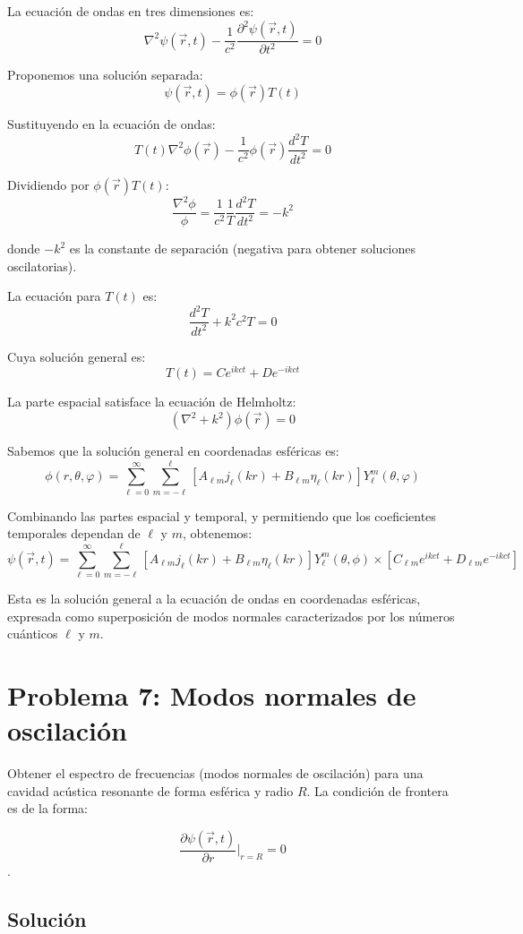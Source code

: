 \documentclass[a4paper]{article}
\begin{document}
La ecuación de ondas en tres dimensiones es:
$$\nabla^2\psi(\vec{r}, t) - \frac{1}{c^2}\frac{\partial^2\psi(\vec{r}, t)}{\partial t^2} = 0$$


Proponemos una solución separada:
$$\psi(\vec{r}, t) = \phi(\vec{r})T(t)$$

Sustituyendo en la ecuación de ondas:
$$T(t)\nabla^2\phi(\vec{r}) - \frac{1}{c^2}\phi(\vec{r})\frac{d^2T}{dt^2} = 0$$

Dividiendo por $\phi(\vec{r})T(t)$:
$$\frac{\nabla^2\phi}{\phi} = \frac{1}{c^2}\frac{1}{T}\frac{d^2T}{dt^2} = -k^2$$

donde $-k^2$ es la constante de separación (negativa para obtener soluciones oscilatorias).


La ecuación para $T(t)$ es:
$$\frac{d^2T}{dt^2} + k^2c^2T = 0$$

Cuya solución general es:
$$T(t) = C e^{ikct} + D e^{-ikct}$$

La parte espacial satisface la ecuación de Helmholtz:
$$(\nabla^2 + k^2)\phi(\vec{r}) = 0$$

Sabemos que la solución general en coordenadas esféricas es:
$$\phi(r, \theta, \varphi) = \sum_{\ell=0}^{\infty} \sum_{m=-\ell}^{\ell} [A_{\ell m} j_\ell(kr) + B_{\ell m} \eta_\ell(kr)] Y_\ell^m(\theta, \varphi)$$

Combinando las partes espacial y temporal, y permitiendo que los coeficientes temporales dependan de $\ell$ y $m$, obtenemos:
$$\psi(\vec{r}, t) = \sum_{\ell=0}^{\infty} \sum_{m=-\ell}^{\ell} [A_{\ell m} j_\ell(kr) + B_{\ell m} \eta_\ell(kr)] Y_\ell^m(\theta, \phi) \times [C_{\ell m} e^{ikct} + D_{\ell m} e^{-ikct}]$$

Esta es la solución general a la ecuación de ondas en coordenadas esféricas, expresada como superposición de modos normales caracterizados por los números cuánticos $\ell$ y $m$.

\section{Problema 7: Modos normales de oscilación}

Obtener el espectro de frecuencias (modos normales de oscilación) para una cavidad acústica resonante de forma esférica y radio $R$. La condición de frontera es de la forma: 

$$\frac{\partial\psi(\vec{r}, t)}{\partial r}\Bigg|_{r=R} = 0$$.

\subsection{Solución}
\end{document}
